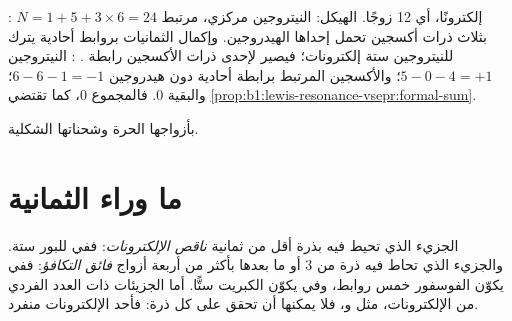 \begin{example}\label{ex:b1:lewis-resonance-vsepr:hno3}
: $N = 1 + 5 + 3 \times 6 = 24$ إلكترونًا، أي 12 زوجًا. الهيكل:
النيتروجين مركزي، مرتبط بثلاث ذرات أكسجين تحمل إحداها
الهيدروجين. وإكمال الثمانيات بروابط أحادية يترك للنيتروجين ستة
إلكترونات؛ فيصير  لإحدى ذرات الأكسجين رابطة . :
النيتروجين $5 - 0 - 4 = +1$؛ والأكسجين المرتبط برابطة أحادية دون هيدروجين
$6 - 6 - 1 = -1$؛ والبقية 0. فالمجموع 0، كما
تقتضي \cref{prop:b1:lewis-resonance-vsepr:formal-sum}.
\end{example}

\begin{omfigure}

{\small {} بأزواجها الحرة وشحناتها الشكلية.}
\end{omfigure}

\section{ما وراء الثمانية}

\begin{definition}\label{def:b1:lewis-resonance-vsepr:hypervalent}
الجزيء الذي تحيط فيه بذرة أقل من ثمانية 
\emph{ناقص الإلكترونات}: ففي  للبور
ستة. والجزيء الذي تحاط فيه ذرة من  3 أو ما بعدها
بأكثر من أربعة أزواج \emph{فائق التكافؤ}: ففي
 يكوّن الفوسفور خمس روابط، وفي  يكوّن الكبريت ستًّا. أما الجزيئات
ذات العدد الفردي من الإلكترونات، مثل  و، فلا يمكنها
أن تحقق  على كل ذرة: فأحد الإلكترونات منفرد.
\end{definition}

